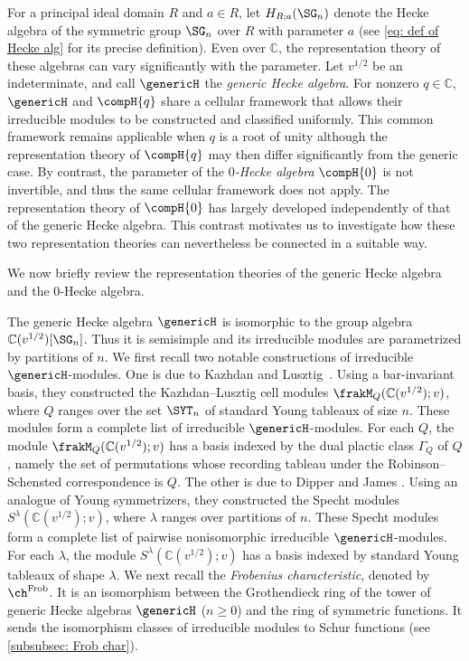 \documentclass[12pt, reqno]{amsart}
\theoremstyle{plain}
\theoremstyle{definition}
\numberwithin{equation}{section}
\numberwithin{figure}{section}
\numberwithin{table}{section}
\def\C{\mathbb C}
\begin{document}
For a principal ideal domain $R$ and $a\in R$, let $H_{R;a}(\SG_n)$ denote the Hecke algebra of the symmetric group $\SG_n$ over $R$ with parameter $a$ (see \cref{eq: def of Hecke alg} for its precise definition).
Even over $\mathbb C$, the representation theory of these algebras can vary significantly with the parameter.
Let $v^{1/2}$ be an indeterminate, and call $\genericH$ the \emph{generic Hecke algebra}.
For nonzero $q\in\mathbb C$, $\genericH$ and $\compH{q}$ share a cellular framework that allows their irreducible modules to be constructed and classified uniformly.
This common framework remains applicable when $q$ is a root of unity although the representation theory of $\compH{q}$ may then differ significantly from the generic case.
By contrast, the parameter of the \emph{$0$-Hecke algebra} $\compH{0}$ is not invertible, and thus the same cellular framework does not apply. 
The representation theory of $\compH{0}$ has largely developed independently of that of the generic Hecke algebra.
This contrast motivates us to investigate how these two representation theories can nevertheless be connected in a suitable way.


We now briefly review the representation theories of the generic Hecke algebra and the $0$-Hecke algebra. 




The generic Hecke algebra $\genericH$ is isomorphic to the group algebra $\C(v^{1/2})[\SG_n]$.
Thus it is semisimple and its irreducible modules are parametrized by partitions of $n$.
We first recall two notable constructions of irreducible $\genericH$-modules.
One is due to  Kazhdan and Lusztig~\cite{79KL}.
Using a bar-invariant basis,  they constructed the Kazhdan--Lusztig cell modules
$\frakM_Q(\C(v^{1/2});v)$, where $Q$ ranges over the set $\SYT_n$ of standard Young tableaux of size $n$.
These modules form a complete list of  irreducible $\genericH$-modules.
For each $Q$,  the module $\frakM_Q(\C(v^{1/2});v)$ has a basis indexed by the dual plactic class $\Gamma_Q$ of $Q$, namely the set of permutations whose recording tableau under the Robinson--Schensted correspondence is $Q$.
The other is due to Dipper and James \cite{86DJ}.
Using an analogue of Young symmetrizers,  they constructed the Specht modules $S^{\lambda}(\C(v^{1/2});v)$, where $\lambda$ ranges over partitions of $n$.
These Specht modules form a complete list of pairwise nonisomorphic irreducible $\genericH$-modules.
For each $\lambda$, the module $S^{\lambda}(\C(v^{1/2});v)$ has a basis indexed by standard Young tableaux of shape $\lambda$.
We next recall the \emph{Frobenius characteristic}, denoted by $\ch^{\rm Frob}$.
It is an isomorphism between the Grothendieck ring of the tower of generic Hecke algebras $\genericH$ ($n \geq 0$) and the ring of symmetric functions.
It sends the isomorphism classes of irreducible modules to Schur functions (see \cref{subsubsec: Frob char}).
\end{document}

